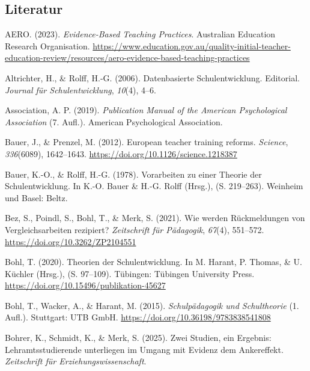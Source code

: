 \documentclass[
  jou,
  floatsintext,
  longtable,
  nolmodern,
  notxfonts,
  notimes,
  colorlinks=true,linkcolor=blue,citecolor=blue,urlcolor=blue]{apa7}
\newlength{\cslhangindent}
\newenvironment{CSLReferences}[2] %
 {\begin{list}{}{%
  \setlength{\itemindent}{0pt}
  \setlength{\leftmargin}{0pt}
  \setlength{\parsep}{0pt}
  \ifodd #1
   \setlength{\leftmargin}{\cslhangindent}
   \setlength{\itemindent}{-1\cslhangindent}
  \fi
  \setlength{\itemsep}{#2\baselineskip}}}
 {\end{list}}
\begin{document}
\subsection{Literatur}\label{literatur}

\label{refs}
\begin{CSLReferences}{1}{0}
AERO. (2023). \emph{Evidence-Based Teaching Practices}. Australian
Education Research Organisation.
\url{https://www.education.gov.au/quality-initial-teacher-education-review/resources/aero-evidence-based-teaching-practices}

Altrichter, H., \& Rolff, H.-G. (2006). Datenbasierte Schulentwicklung.
Editorial. \emph{Journal für Schulentwicklung}, \emph{10}(4), 4--6.

Association, A. P. (2019). \emph{Publication Manual of the American
Psychological Association} (7. Aufl.). American Psychological
Association.

Bauer, J., \& Prenzel, M. (2012). European teacher training reforms.
\emph{Science}, \emph{336}(6089), 1642--1643.
\url{https://doi.org/10.1126/science.1218387}

Bauer, K.-O., \& Rolff, H.-G. (1978). Vorarbeiten zu einer Theorie der
Schulentwicklung. In K.-O. Bauer \& H.-G. Rolff (Hrsg.), (S. 219--263).
Weinheim und Basel: Beltz.

Bez, S., Poindl, S., Bohl, T., \& Merk, S. (2021). Wie werden
Rückmeldungen von Vergleichsarbeiten rezipiert? \emph{Zeitschrift für
Pädagogik}, \emph{67}(4), 551--572.
\url{https://doi.org/10.3262/ZP2104551}

Bohl, T. (2020). Theorien der Schulentwicklung. In M. Harant, P. Thomas,
\& U. Küchler (Hrsg.), (S. 97--109). Tübingen: Tübingen University
Press. \url{https://doi.org/10.15496/publikation-45627}

Bohl, T., Wacker, A., \& Harant, M. (2015). \emph{Schulpädagogik und
Schultheorie} (1. Aufl.). Stuttgart: UTB GmbH.
\url{https://doi.org/10.36198/9783838541808}

Bohrer, K., Schmidt, K., \& Merk, S. (2025). Zwei Studien, ein Ergebnis:
Lehramtsstudierende unterliegen im Umgang mit Evidenz dem Ankereffekt.
\emph{Zeitschrift für Erziehungswissenschaft}.


\end{CSLReferences}
\end{document}
